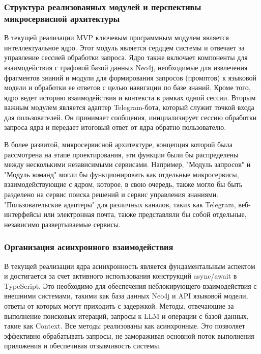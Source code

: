 \subsubsection{Структура реализованных модулей и перспективы микросервисной архитектуры}

В текущей реализации MVP ключевым программным модулем является интеллектуальное ядро. Этот модуль является сердцем системы и отвечает за управление сессией обработки запроса. Ядро также включает компоненты для взаимодействия с графовой базой данных Neo4j, необходимые для извлечения фрагментов знаний и модули для формирования запросов (промптов) к языковой модели и обработки ее ответов с целью навигации по базе знаний. Кроме того, ядро ведет историю взаимодействия и контекста в рамках одной сессии. Вторым важным модулем является адаптер Telegram-бота, который служит точкой входа для пользователей. Он принимает сообщения, инициализирует сессию обработки запроса ядра и передает итоговый ответ от ядра обратно пользователю.

В более развитой, микросервисной архитектуре, концепция которой была рассмотрена на этапе проектирования, эти функции были бы распределены между несколькими независимыми сервисами. Например, "Модуль запросов" и "Модуль команд" могли бы функционировать как отдельные микросервисы, взаимодействующие с ядром, которое, в свою очередь, также могло бы быть разделено на сервис поиска решений и сервис управления знаниями. "Пользовательские адаптеры" для различных каналов, таких как Telegram, веб-интерфейсы или электронная почта, также представляли бы собой отдельные, независимо развертываемые сервисы.

\subsubsection{Организация асинхронного взаимодействия}

В текущей реализации ядра асинхронность является фундаментальным аспектом и достигается за счет активного использования конструкций async/await в TypeScript. Это необходимо для обеспечения неблокирующего взаимодействия с внешними системами, такими как база данных Neo4j и API языковой модели, ответы от которых могут приходить с задержкой. Методы, отвечающие за выполнение поисковых итераций, запросы к LLM и операции с базой данных, такие как Context. Все методы реализованы как асинхронные. Это позволяет эффективно обрабатывать запросы, не замораживая основной поток выполнения приложения и обеспечивая отзывчивость системы.

